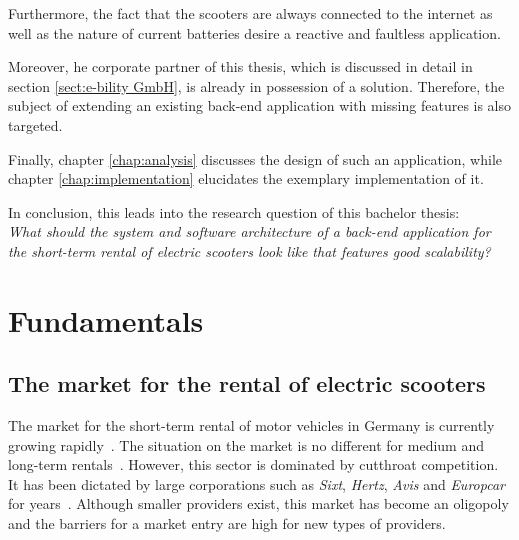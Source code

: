\documentclass[12pt,a4paper,twoside]{report}
\begin{document}
Furthermore, the fact that the scooters are always connected to the internet
as well as the nature of current batteries desire a reactive and faultless application.

Moreover, he corporate partner of this thesis, which is discussed in detail
in section \ref{sect:e-bility GmbH}, is already in possession of a solution.
Therefore, the subject of extending an existing back-end application
with missing features is also targeted.

Finally, chapter \ref{chap:analysis} discusses the design of such an application,
while chapter \ref{chap:implementation} elucidates the exemplary implementation of it.

In conclusion, this leads into the research question of this bachelor thesis:\\
\emph{What should the system and software architecture of a back-end application
for the short-term rental of electric scooters look like that features
good scalability?}



\chapter{Fundamentals} \label{chap:fundamentals}



\section{The market for the rental of electric scooters} \label{sect:electric-scooter-market}

The market for the short-term rental of motor vehicles in Germany
is currently growing rapidly~\cite{bundesverband-carsharing-statistics}.
The situation on the market is no different for medium and long-term rentals~\cite{sparkasse-kfz-vermietung}.
However, this sector is dominated by cutthroat competition.
It has been dictated by large corporations such as \textit{Sixt}, \textit{Hertz},
\textit{Avis} and \textit{Europcar} for years~\cite{sparkasse-kfz-vermietung}.
Although smaller providers exist, this market has become an oligopoly and
the barriers for a market entry are high for new types of providers.
\end{document}

